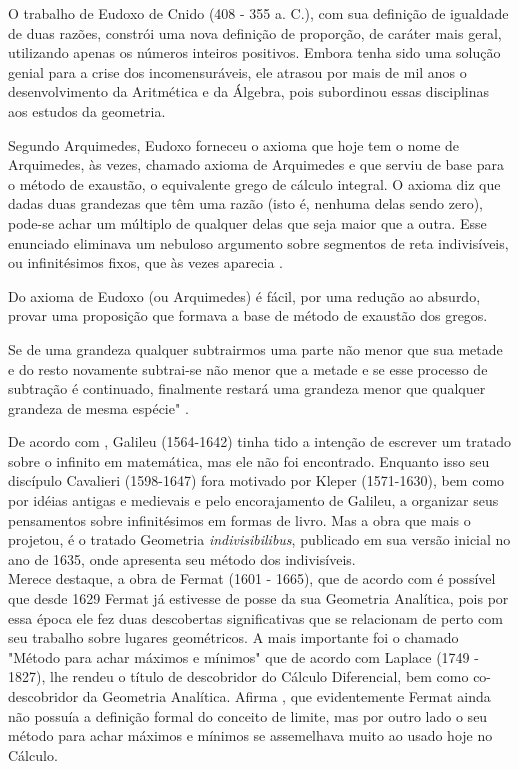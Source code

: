 O trabalho de Eudoxo de Cnido (408 - 355 a. C.), com sua definição
de igualdade de duas razões, constrói uma nova definição de
proporção, de caráter mais geral, utilizando apenas os números
inteiros positivos. Embora tenha sido uma solução genial para a
crise dos incomensuráveis, ele atrasou por mais de mil anos o
desenvolvimento da Aritmética e da Álgebra, pois subordinou essas
disciplinas aos estudos da geometria.\\


\begin{citacao}
Segundo Arquimedes, Eudoxo forneceu o axioma que hoje tem o nome de Arquimedes, às
vezes, chamado axioma de Arquimedes e que serviu de base para o
método de exaustão, o equivalente grego de cálculo integral. O
axioma diz que dadas duas grandezas que têm uma razão (isto é,
nenhuma delas sendo zero), pode-se achar um múltiplo de qualquer
delas que seja maior que a outra. Esse enunciado eliminava um
nebuloso argumento sobre segmentos de reta indivisíveis, ou
infinitésimos fixos, que às vezes aparecia \cite[p.62]{boyer}.
\end{citacao}


\medskip
 Do axioma de Eudoxo (ou Arquimedes) é fácil, por uma redução ao absurdo, provar uma
proposição que formava a base de método de exaustão dos gregos. 
\begin{citacao}
Se de uma grandeza qualquer subtrairmos uma parte não menor que sua
metade e do resto novamente subtrai-se não menor que a metade e se
esse processo de subtração é continuado, finalmente restará uma
grandeza menor que qualquer grandeza de mesma espécie" \cite[p.63]{boyer}. 
\end{citacao}


 De acordo com , Galileu (1564-1642)
tinha tido a intenção de escrever um tratado sobre o infinito em
matemática, mas ele não foi encontrado. Enquanto isso seu discípulo
Cavalieri (1598-1647) fora motivado por Kleper (1571-1630), bem como
por idéias antigas e medievais e pelo encorajamento de Galileu, a
organizar seus pensamentos sobre infinitésimos em formas de livro.
Mas a obra que mais o projetou, é o tratado Geometria
\textit{indivisibilibus}, publicado em sua versão inicial no ano de 1635,
onde apresenta seu método dos indivisíveis.\\


 Merece destaque, a obra de Fermat (1601 - 1665), que de acordo com 
 é possível que desde 1629 Fermat já estivesse de posse
da sua Geometria Analítica, pois por essa época ele fez duas
descobertas significativas que se relacionam de perto com seu
trabalho sobre lugares geométricos. A mais importante foi o chamado
"Método para achar máximos e mínimos"   que de acordo com Laplace
(1749 - 1827), lhe rendeu o título de descobridor do Cálculo
Diferencial, bem como co-descobridor da Geometria Analítica.  Afirma 
, que evidentemente Fermat ainda não possuía a definição
formal do conceito de limite, mas por outro lado o seu método para
achar máximos e mínimos se assemelhava muito ao usado hoje no
Cálculo.\\

